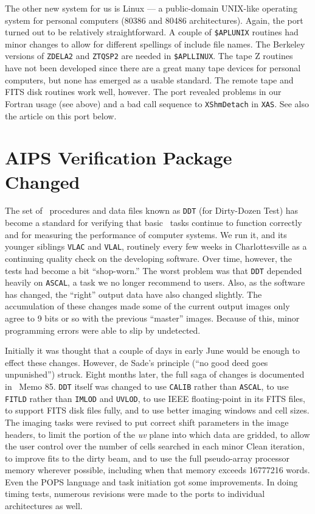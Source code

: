 The other new system for us is Linux --- a public-domain UNIX-like
operating system for personal computers (80386 and 80486
architectures).  Again, the port turned out to be relatively
straightforward.  A couple of {\tt \$APLUNIX} routines had minor
changes to allow for different spellings of include file names.  The
Berkeley versions of {\tt ZDELA2} and {\tt ZTQSP2} are needed in
\hbox{{\tt \$APLLINUX}}.  The tape Z routines have not been developed
since there are a great many tape devices for personal computers, but
none has emerged as a usable standard.  The remote tape and FITS disk
routines work well, however.  The port revealed problems in our
Fortran usage (see above) and a bad call sequence to {\tt XShmDetach}
in \hbox{{\tt XAS}}.  See also the article on this port below.

\eject

\section{AIPS Verification Package Changed}

The set of \AIPS\ procedures and data files known as {\tt DDT} (for
Dirty-Dozen Test) has become a standard for verifying that basic
\AIPS\ tasks continue to function correctly and for measuring the
performance of computer systems.  We run it, and its younger siblings
{\tt VLAC} and {\tt VLAL}, routinely every few weeks in
Charlottesville as a continuing quality check on the developing
software.  Over time, however, the tests had become a bit
``shop-worn.''  The worst problem was that {\tt DDT} depended heavily
on {\tt ASCAL}, a task we no longer recommend to users.  Also, as the
software has changed, the ``right'' output data have also changed
slightly.  The accumulation of these changes made some of the current
output images only agree to 9 bits or so with the previous ``master''
images.  Because of this, minor programming errors were able to slip
by undetected.

Initially it was thought that a couple of days in early June would be
enough to effect these changes.  However, de Sade's principle (``no
good deed goes unpunished'') struck.  Eight months later, the full
saga of changes is documented in \AIPS\ Memo 85.  {\tt DDT} itself was
changed to use {\tt CALIB} rather than {\tt ASCAL}, to use {\tt FITLD}
rather than {\tt IMLOD} and {\tt UVLOD}, to use IEEE floating-point in
its FITS files, to support FITS disk files fully, and to use better
imaging windows and cell sizes.  The imaging tasks were revised to put
correct shift parameters in the image headers, to limit the portion of
the {\it uv} plane into which data are gridded, to allow the user
control over the number of cells searched in each minor Clean
iteration, to improve fits to the dirty beam, and to use the full
pseudo-array processor memory wherever possible, including when that
memory exceeds 16777216 words.  Even the POPS language and task
initiation got some improvements.  In doing timing tests, numerous
revisions were made to the ports to individual architectures as
well.

